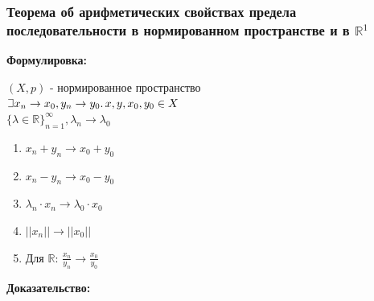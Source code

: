 \documentclass{article}
\def\letus{%
\mathord{\setbox0=\hbox{$\exists$}%
         \hbox{\kern 0.125\wd0%
               \vbox to \ht0{%
                  \hrule width 0.75\wd0%
                  \vfill%
                  \hrule width 0.75\wd0}%
               \vrule height \ht0%
               \kern 0.125\wd0}%
       }%
        }
\begin{document}
\subsubsection{Теорема об арифметических свойствах предела последовательности в нормированном пространстве и в \texorpdfstring{$\mathbb{R}$}{R}\texorpdfstring{$^1$}{}}

\textbf{Формулировка:}

$(X, p)$ - нормированное пространство\\
$\letus x_n \rightarrow x_0, y_n \rightarrow y_0.\, x, y, x_0, y_0 \in X$\\
$\{\lambda\in \mathbb{R}\}_{n=1}^\infty, \lambda_n \rightarrow \lambda_0$
\begin{enumerate}
    \item $x_n + y_n \rightarrow x_0 + y_0$
    \item $x_n - y_n \rightarrow x_0 - y_0$
    \item $\lambda_n \cdot x_n \rightarrow \lambda_0 \cdot x_0$
    \item $||x_n|| \rightarrow ||x_0||$
    \item Для $\mathbb{R}$: $\frac{x_n}{y_n} \rightarrow \frac{x_0}{y_0}$
\end{enumerate}

\textbf{Доказательство:}
\end{document}
